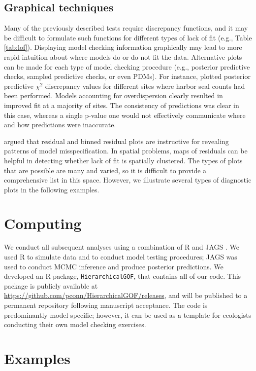 \documentclass[12pt,english]{article}
\begin{document}
\begin{spacing}{1.9}
\subsection{Graphical techniques}

Many of the previously described tests require discrepancy functions,
and it may be difficult to formulate such functions for different
types of lack of fit (e.g., Table \ref{tab:lof}).  Displaying model
checking information graphically may lead to more rapid intuition
about where models do or do not fit the data.  Alternative plots can
be made for each type of model checking procedure (e.g., posterior
predictive checks, sampled predictive checks, or even PDMs).  For
instance, \citet{VerHoefFrost2003} plotted posterior predictive
$\chi^2$ discrepancy values for different sites where harbor seal
counts had been performed.  Models accounting for overdispersion
clearly resulted in improved fit at a majority of sites.  The
consistency of predictions was clear in this case, whereas a single
p-value one would not effectively communicate where and how
predictions were inaccurate.

\citet{GelmanEtAl2014} argued that residual and binned residual plots
are instructive for revealing patterns of model misspecification.  In
spatial problems, maps of residuals can be helpful in detecting
whether lack of fit is spatially clustered.  The types of plots that
are possible are many and varied, so it is difficult to provide a
comprehensive list in this space. However, we illustrate several types
of diagnostic plots in the following examples.

\section{Computing}

We conduct all subsequent analyses using a combination of R
\citep{RTeam2017} and JAGS \citep{Plummer2003}.  We used R to simulate
data and to conduct model testing procedures; JAGS was used to conduct
MCMC inference and produce posterior predictions. We developed an R
package, \texttt{HierarchicalGOF}, that contains all of our code.
This package is publicly available at
\url{https://github.com/pconn/HierarchicalGOF/releases}, and will be
published to a permanent repository following manuscript
acceptance. The code is predominantly model-specific; however, it can
be used as a template for ecologists conducting their own model
checking exercises.


\section{Examples}


\end{spacing}
\end{document}

